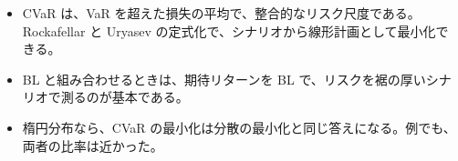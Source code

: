 \begin{keybox}[この章のまとめ]
\begin{itemize}
\item CVaR は、VaR を超えた損失の平均で、整合的なリスク尺度である。Rockafellar と Uryasev の定式化で、シナリオから線形計画として最小化できる。
\item BL と組み合わせるときは、期待リターンを BL で、リスクを裾の厚いシナリオで測るのが基本である。
\item 楕円分布なら、CVaR の最小化は分散の最小化と同じ答えになる。例でも、両者の比率は近かった。
\end{itemize}
\end{keybox}
